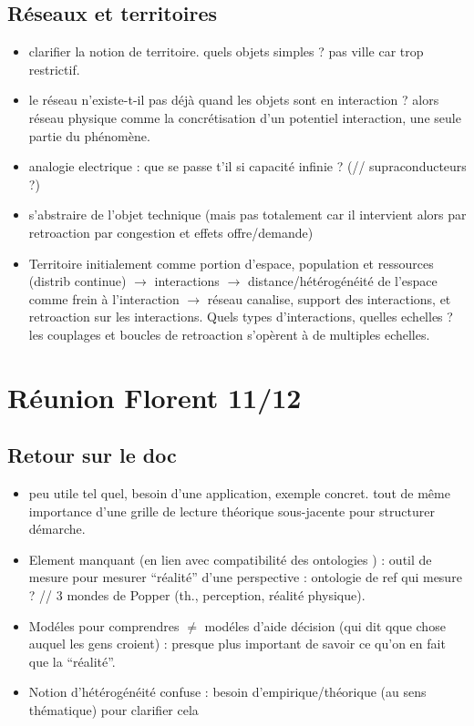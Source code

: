\subsection*{R{\'e}seaux et territoires}

\begin{itemize}
\item clarifier la notion de territoire. quels objets simples ? pas ville car trop restrictif.
\item le r{\'e}seau n'existe-t-il pas d{\'e}j{\`a} quand les objets sont en interaction ? alors r{\'e}seau physique comme la concr{\'e}tisation d'un potentiel interaction, une seule partie du ph{\'e}nom{\`e}ne.
\item analogie electrique : que se passe t'il si capacit{\'e} infinie ? (// supraconducteurs ?)
\item s'abstraire de l'objet technique (mais pas totalement car il intervient alors par retroaction par congestion et effets offre/demande) 
\item Territoire initialement comme portion d'espace, population et ressources (distrib continue) $\rightarrow$ interactions $\rightarrow$ distance/h{\'e}t{\'e}rog{\'e}n{\'e}it{\'e} de l'espace comme frein à l'interaction $\rightarrow$ r{\'e}seau canalise, support des interactions, et retroaction sur les interactions. Quels types d'interactions, quelles echelles ? les couplages et boucles de retroaction s'op{\`e}rent à de multiples echelles.
\end{itemize}


\section*{R{\'e}union Florent 11/12}

\subsection*{Retour sur le doc}

\begin{itemize}
\item peu utile tel quel, besoin d'une application, exemple concret. tout de m{\^e}me importance d'une grille de lecture th{\'e}orique sous-jacente pour structurer d{\'e}marche.
\item Element manquant (en lien avec compatibilit{\'e} des ontologies ) : outil de mesure pour mesurer ``r{\'e}alit{\'e}'' d'une perspective : ontologie de ref qui mesure ? // 3 mondes de Popper (th., perception, r{\'e}alit{\'e} physique).
\item Mod{\'e}les pour comprendres $\neq$ mod{\'e}les d'aide d{\'e}cision (qui dit qque chose auquel les gens croient) : presque plus important de savoir ce qu'on en fait que la ``r{\'e}alit{\'e}''.
\item Notion d'h{\'e}t{\'e}rog{\'e}n{\'e}it{\'e} confuse : besoin d'empirique/th{\'e}orique (au sens th{\'e}matique) pour clarifier cela
\end{itemize}

